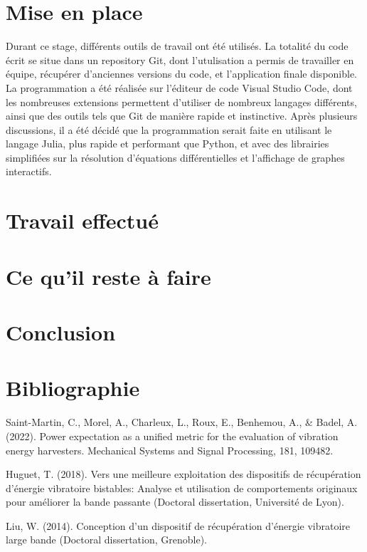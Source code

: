 \documentclass[a4paper, french, 12pt, titlepage]{report}
\begin{document}
\section{Mise en place}

Durant ce stage, différents outils de travail ont été utilisés. La totalité du code écrit se situe dans un repository Git, dont l'utulisation a permis de travailler en équipe, récupérer d'anciennes versions du code, et l'application finale disponible. La programmation a été réalisée sur l'éditeur de code Visual Studio Code, dont les nombreuses extensions permettent d'utiliser de nombreux langages différents, ainsi que des outils tels que Git de manière rapide et instinctive. Après plusieurs discussions, il a été décidé que la programmation serait faite en utilisant le langage Julia, plus rapide et performant que Python, et avec des librairies simplifiées sur la résolution d'équations différentielles et l'affichage de graphes interactifs. 

\section{Travail effectué}

\section{Ce qu'il reste à faire}

\section{Conclusion}



\section*{Bibliographie}

Saint-Martin, C., Morel, A., Charleux, L., Roux, E., Benhemou, A., \& Badel, A. (2022). Power expectation as a unified metric for the evaluation of vibration energy harvesters. Mechanical Systems and Signal Processing, 181, 109482.

Huguet, T. (2018). Vers une meilleure exploitation des dispositifs de récupération d’énergie vibratoire bistables: Analyse et utilisation de comportements originaux pour améliorer la bande passante (Doctoral dissertation, Université de Lyon).

Liu, W. (2014). Conception d'un dispositif de récupération d'énergie vibratoire large bande (Doctoral dissertation, Grenoble).

	
\end{document}
